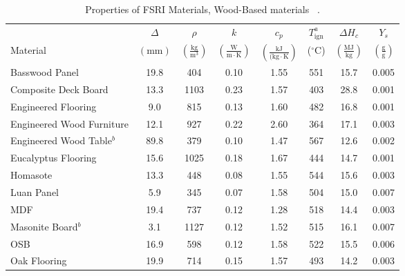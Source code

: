 \clearpage

\begin{table}[!h]
\caption[Properties of FSRI Materials, Wood-Based materials]{Properties of FSRI Materials, Wood-Based materials ~\cite{McKinnon:FSRI2023_Data}.}
\centering
\begin{tabular}{|p{4.5cm}|c|c|c|c|c|c|c|}
\hline
            & \centering$\Delta$& \centering$\rho$& \centering$k$& \centering$c_{p}$ &\centering$T_{\mathrm{ign}}^{a}$&\centering$\Delta H_{c}$& $Y_{s}$ \\
Material    & \centering$\mathrm{\left(mm\right)}$ & \centering$\mathrm{\left(\frac{kg}{m^{3}}\right)}$ & \centering$\mathrm{\left(\frac{W}{m\cdot K}\right)}$ & \centering$\mathrm{\left(\frac{kJ}{(kg\cdot K}\right)}$ & \centering($\mathrm{^{\circ}C}$)   & \centering$\left(\mathrm{\frac{MJ}{kg}}\right)$ & $\mathrm{\left(\frac{g}{g}\right)}$ \\ \hline
\hline
Basswood Panel                                    & 19.8 & 404  & 0.10 & 1.55 & 551 & 15.7 & 0.005 \\\hline
Composite Deck Board                              & 13.3 & 1103 & 0.23 & 1.57 & 403 & 28.8 & 0.001 \\\hline
Engineered Flooring                               & 9.0  & 815  & 0.13 & 1.60 & 482 & 16.8 & 0.001 \\\hline
Engineered Wood Furniture                         & 12.1 & 927  & 0.22 & 2.60 & 364 & 17.1 & 0.003 \\\hline
Engineered Wood Table$^{b}$                       & 89.8 & 379  & 0.10 & 1.47 & 567 & 12.6 & 0.002 \\\hline
Eucalyptus Flooring                               & 15.6 & 1025 & 0.18 & 1.67 & 444 & 14.7 & 0.001 \\\hline
Homasote                                          & 13.3 & 448  & 0.08 & 1.55 & 544 & 15.6 & 0.003 \\\hline
Luan Panel                                        & 5.9  & 345  & 0.07 & 1.58 & 504 & 15.0 & 0.007 \\\hline
MDF                                               & 19.4 & 737  & 0.12 & 1.28 & 518 & 14.4 & 0.003 \\\hline
Masonite Board$^{b}$                              & 3.1  & 1127 & 0.12 & 1.52 & 515 & 16.1 & 0.007 \\\hline
OSB                                               & 16.9 & 598  & 0.12 & 1.58 & 522 & 15.5 & 0.006 \\\hline
Oak Flooring                                      & 19.9 & 714  & 0.15 & 1.57 & 493 & 14.2 & 0.003 \\\hline

\end{tabular}
\end{table}
